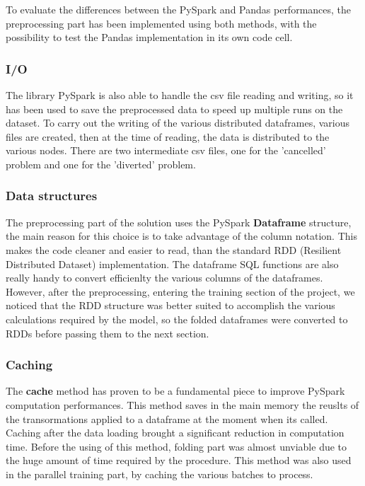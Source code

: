 \documentclass[
	letterpaper, %
	10pt, %
]{class}
\begin{document}
To evaluate the differences between the PySpark and Pandas performances, the preprocessing part has been implemented using both methods, with the possibility to test the Pandas implementation in its own code cell.

\subsubsection{I/O}

The library PySpark is also able to handle the csv file reading and writing, so it has been used to save the preprocessed data to speed up multiple runs on the dataset. To carry out the writing of the various distributed dataframes, various files are created, then at the time of reading, the data is distributed to the various nodes. There are two intermediate csv files, one for the 'cancelled' problem and one for the 'diverted' problem.\\

\subsubsection{Data structures}

The preprocessing part of the solution uses the PySpark \textbf{Dataframe} structure, the main reason for this choice is to take advantage of the column notation. This makes the code cleaner and easier to read, than the standard RDD (Resilient Distributed Dataset) implementation. The dataframe SQL functions are also really handy to convert efficienlty the various columns of the dataframes.
However, after the preprocessing, entering the training section of the project, we noticed that the RDD structure was better suited to accomplish the various calculations required by the model, so the folded dataframes were converted to RDDs before passing them to the next section.

\subsubsection{Caching}

The \textbf{cache} method has proven to be a fundamental piece to improve PySpark computation performances. This method saves in the main memory the reuslts of the transormations applied to a dataframe at the moment when its called. Caching after the data loading brought a significant reduction in computation time. Before the using of this method, folding part was almost unviable due to the huge amount of time required by the procedure.
This method was also used in the parallel training part, by caching the various batches to process.
\end{document}

